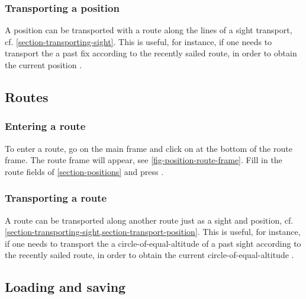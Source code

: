 \documentclass{ol-softwaremanual}
\begin{document}
\subsubsection{Transporting a \gls{position}}\label{section-transport-position}

A \gls{position} can be \gls{transported} with a \gls{route} along the lines of a \gls{sight} transport, cf. \cref{section-transporting-sight}. This is useful, for instance, if one needs to transport the a past \gls{fix} according to the recently sailed \gls{route}, in order to obtain the current  \gls{position} \cite{bowditch2002the}. 


\subsection{Routes}\label{section-handle-routes}


\subsubsection{Entering a \gls{route}}\label{section-entering-route}

To enter a \gls{route}, go on the main frame and click on  at the bottom of the \gls{route} frame. The \gls{route} frame will appear, see \cref{fig-position-route-frame}. Fill in the \gls{route} fields of \cref{section-positions} and press . 





\subsubsection{Transporting a \gls{route}}\label{section-transporting-route}

A \gls{route} can be \gls{transported} along another \gls{route} just as a  \gls{sight} and \gls{position}, cf. \cref{section-transporting-sight,section-transport-position}. This is useful, for instance, if one needs to transport the a  \gls{circle-of-equal-altitude} of a past \gls{sight} according to the recently sailed \gls{route}, in order to obtain the current \gls{circle-of-equal-altitude} \cite{bowditch2002the}.

\subsection{Loading and saving}\label{sec-load-save}
\end{document}
